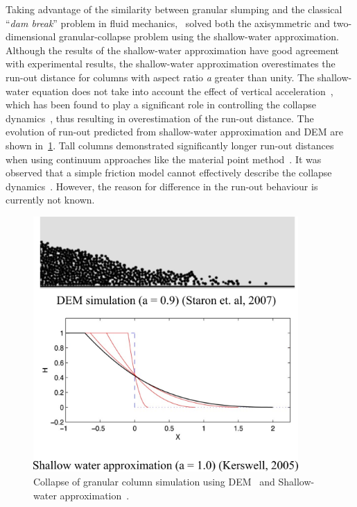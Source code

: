 Taking advantage 
of the similarity between granular slumping and the classical ``\textit{dam 
break}'' problem in fluid mechanics,~\citet{Kerswell2005} solved both the 
axisymmetric and two-dimensional granular-collapse problem using the 
shallow-water approximation. Although the results of the shallow-water 
approximation have good agreement with experimental results, the shallow-water 
approximation overestimates the run-out distance for columns with aspect ratio 
\textit{a} greater than unity. The shallow-water equation does not take into 
account the effect of vertical acceleration~\citep{Lajeunesse2005}, which has 
been found to play a significant role in controlling the collapse 
dynamics~\citep{Staron2007a}, thus resulting in overestimation of the run-out 
distance. The evolution of run-out predicted from shallow-water approximation 
and DEM are shown in~\cref{fig:DEM_Shallow}. Tall 
columns demonstrated significantly longer run-out distances when using 
continuum 
approaches like the material point method~\citep{Bandara2013,Mast2014}. It was 
observed that a simple friction model cannot effectively describe the collapse 
dynamics~\citep{Staron2007a}. However, the reason for difference in the run-out 
behaviour is currently not known. 

\begin{figure}
\centering
\includegraphics[width=0.9\textwidth]{DEM_Shallow}
\caption[Collapse of granular column simulation using DEM
and Shallow-water approximation]{Collapse of granular column simulation using 
DEM~\citep{Staron2007a} and Shallow-water approximation~\citep{Kerswell2005}.}
\label{fig:DEM_Shallow}
\end{figure}

